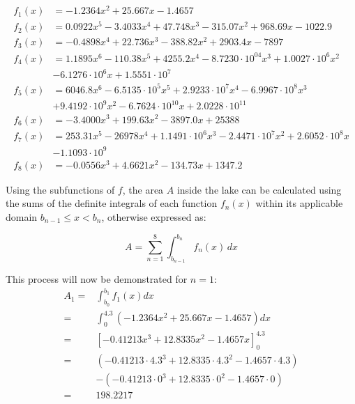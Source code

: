 \documentclass{article}
\theoremstyle{definition}
\begin{document}
        \begin{align*} %
            f_1(x) &= -1.2364x^2 + 25.667x - 1.4657 \\
            f_2(x) &= 0.0922x^5 - 3.4033x^4 + 47.748x^3 - 315.07x^2 + 968.69x - 1022.9 \\
            f_3(x) &= -0.4898x^4 + 22.736x^3 - 388.82x^2 + 2903.4x - 7897 \\
            f_4(x) &= 1.1895x^6 - 110.38x^5 + 4255.2x^4 - 8.7230\cdot 10^04x^3 + 1.0027\cdot 10^6x^2 \\ &- 6.1276\cdot 10^6x + 1.5551\cdot 10^7 \\
            f_5(x) &= 6046.8x^6 - 6.5135 \cdot 10^5x^5 + 2.9233 \cdot 10^7x^4 - 6.9967 \cdot 10^8x^3 \\ &+ 9.4192 \cdot 10^9x^2 - 6.7624 \cdot 10^{10}x + 2.0228 \cdot 10^{11} \\
            f_6(x) &= -3.4000x^3 + 199.63x^2 - 3897.0x + 25388 \\
            f_7(x) &= 253.31x^5 - 26978x^4 + 1.1491 \cdot 10^6x^3 - 2.4471 \cdot 10^7x^2 + 2.6052 \cdot 10^8x \\ &- 1.1093 \cdot 10^9 \\
            f_8(x) &= -0.0556x^3 + 4.6621x^2 - 134.73x + 1347.2
        \end{align*}

        Using the subfunctions of $f$, the area $A$ inside the lake can be calculated using the sums of the definite integrals of each function $f_n(x)$ within its applicable domain $b_{n-1} \leq x < b_n$, otherwise expressed as:

        \begin{equation}\label{eqnAreaOfLakeFromFuncs}
           A = \sum_{n=1}^8 \int_{b_{n-1}}^{b_n} f_n(x)\,dx
        \end{equation}

        This process will now be demonstrated for $n = 1$:
        \begin{align*} %
            A_1 =& \int_{b_0}^{b_1} f_1(x)dx \\
            =& \int_{0}^{4.3} \left(-1.2364x^2 + 25.667x - 1.4657\right)dx \\
            =& \left[-0.41213x^3 + 12.8335x^2 - 1.4657x\right]_0^{4.3} \\
            =& (-0.41213 \cdot 4.3^3 + 12.8335 \cdot 4.3^2 - 1.4657 \cdot 4.3) \\ &- (-0.41213 \cdot 0^3 + 12.8335 \cdot 0^2 - 1.4657 \cdot 0) \\
            =& 198.2217
        \end{align*}
\end{document}
